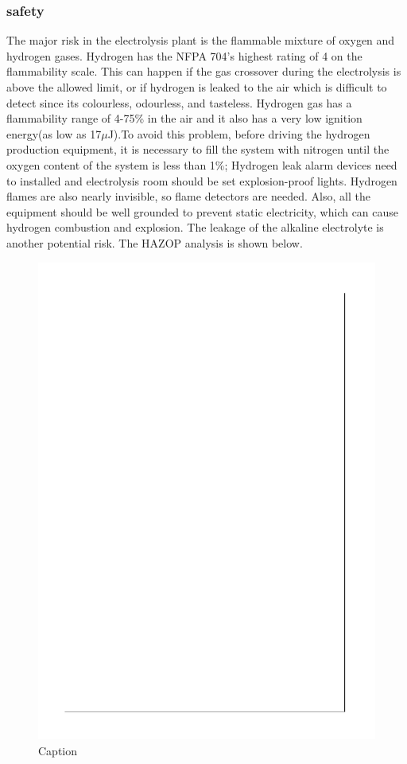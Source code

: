 \subsubsection{safety}
The major risk in the electrolysis plant is the flammable mixture of oxygen and hydrogen gases.
Hydrogen has the NFPA 704's highest rating of 4 on the flammability scale. \cite{safety} This can happen if the gas crossover during the electrolysis is above the allowed limit, or if hydrogen is leaked to the air which is difficult to detect since its colourless, odourless, and tasteless. Hydrogen gas has a flammability range of 4-75\% in the air and it also has a very low ignition energy(as low as 17$\mu$J).To avoid this problem, 
before driving the hydrogen production equipment, it is necessary to fill the system with nitrogen until the oxygen content of the system is less than 1\%; Hydrogen leak alarm devices need to installed and electrolysis room should be set explosion-proof lights. Hydrogen flames are also nearly invisible, so flame detectors are needed. Also, all the equipment should be well grounded to prevent static electricity, which can cause hydrogen combustion and explosion. The leakage of the alkaline electrolyte is another potential risk. The HAZOP analysis is shown below.
\begin{figure}[p]
    \centering
    \includegraphics{electrolysis/hazop.pdf}
    \caption{Caption}
    \label{fig:my_label}
\end{figure}

